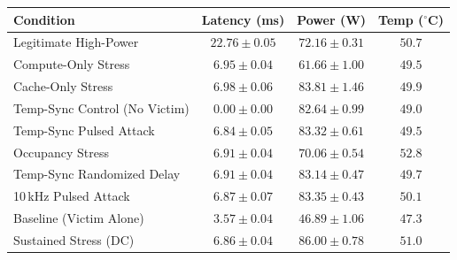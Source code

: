 \begin{tabular}{lccc}
\toprule
Condition & Latency (ms) & Power (W) & Temp ($^\circ$C) \\
\midrule
Legitimate High-Power & $22.76 \pm 0.05$ & $72.16 \pm 0.31$ & $50.7$ \\
Compute-Only Stress & $6.95 \pm 0.04$ & $61.66 \pm 1.00$ & $49.5$ \\
Cache-Only Stress & $6.98 \pm 0.06$ & $83.81 \pm 1.46$ & $49.9$ \\
Temp-Sync Control (No Victim) & $0.00 \pm 0.00$ & $82.64 \pm 0.99$ & $49.0$ \\
Temp-Sync Pulsed Attack & $6.84 \pm 0.05$ & $83.32 \pm 0.61$ & $49.5$ \\
Occupancy Stress & $6.91 \pm 0.04$ & $70.06 \pm 0.54$ & $52.8$ \\
Temp-Sync Randomized Delay & $6.91 \pm 0.04$ & $83.14 \pm 0.47$ & $49.7$ \\
10\,kHz Pulsed Attack & $6.87 \pm 0.07$ & $83.35 \pm 0.43$ & $50.1$ \\
Baseline (Victim Alone) & $3.57 \pm 0.04$ & $46.89 \pm 1.06$ & $47.3$ \\
Sustained Stress (DC) & $6.86 \pm 0.04$ & $86.00 \pm 0.78$ & $51.0$ \\
\bottomrule
\end{tabular}
